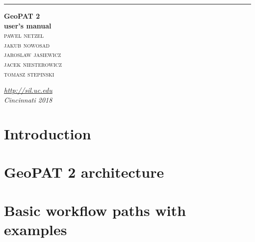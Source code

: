 \documentclass[a4paper, 11pt]{book}
\begin{document}
\begin{titlepage} 
	
	\raggedleft %
	
	\rule{1pt}{\textheight} %
	\hspace{0.05\textwidth} %
	\parbox[b]{0.75\textwidth}{ %
		
		{\Huge\bfseries GeoPAT 2 \\[0.5\baselineskip] user's manual}\\[2\baselineskip] %
		{\Large\textsc{pawel netzel}}\\ %
		{\Large\textsc{jakub nowosad}}\\ %
		{\Large\textsc{jaroslaw jasiewicz}}\\ %
		{\Large\textsc{jacek niesterowicz}}\\ %
		{\Large\textsc{tomasz stepinski}} %

		\vspace{0.5\textheight} %
		{\large\textit{\url{http://sil.uc.edu}}}\\
		{\large\textit{Cincinnati 2018}}\\
	}

\end{titlepage}

\newpage

\tableofcontents
\newpage

\chapter{Introduction}


\chapter{GeoPAT 2 architecture}


\chapter{Basic workflow paths with examples}

\end{document}
